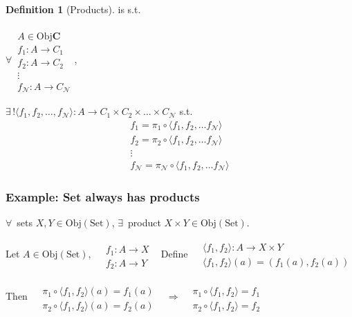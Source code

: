 \documentclass[twoside,landscape,10pt]{amsart}
\theoremstyle{plain}
\theoremstyle{definition}
\newtheorem{definition}{Definition}
\theoremstyle{remark}
\begin{document}
\begin{multicols*}{2}
\begin{definition}[Products]
is s.t. 

$\forall \, \begin{aligned}  \quad \\ 
  A \in \text{Obj}\mathbf{C} \\
  f_1 : A \to C_1 \\
  f_2 : A \to C_2 \\
  \vdots \\
  f_{\mathcal{N}} : A \to C_{\mathcal{N}} \end{aligned}$, 

$\exists \, ! \langle f_1 ,f_2 , \dots , f_{\mathcal{N}} \rangle : A \to C_1 \times C_2 \times \dots \times C_{\mathcal{N}}$ s.t.
\[
\begin{aligned}
  f_1 = \pi_1 \circ \langle f_1 , f_2 , \dots f_{\mathcal{N}} \rangle \\ 
  f_2 = \pi_2 \circ \langle f_1 , f_2 , \dots f_{\mathcal{N}} \rangle \\ 
\vdots  \\ 
  f_{\mathcal{N}} = \pi_{\mathcal{N}} \circ \langle f_1 , f_2 , \dots f_{\mathcal{N}} \rangle 
\end{aligned}
\]

\end{definition}



\subsubsection{Example: Set always has products}

$\forall \, $ sets $X,Y \in \text{Obj}(\text{Set})$, $\exists \, $ product $X\times Y \in \text{Obj}(\text{Set})$.  

Let $A \in \text{Obj}(\text{Set})$, $\begin{aligned} & \quad \\
  & f_1 : A \to X \\
  & f_2 : A \to Y \end{aligned}$ \qquad \, Define $\begin{aligned} & \langle f_1, f_2 \rangle : A \to X \times Y  \\
  & \langle f_1 ,f_2 \rangle (a) = (f_1(a), f_2(a)) \end{aligned}$

Then $\begin{aligned} & \quad \\
  & \pi_1 \circ \langle f_1 , f_2 \rangle (a) = f_1(a) \\
  & \pi_2 \circ \langle f_1, f_2 \rangle (a) = f_2(a) \end{aligned}$ \qquad \, $\Longrightarrow \begin{aligned}  & \quad \\
  & \pi_1 \circ \langle f_1 , f_2 \rangle = f_1 \\
  & \pi_2 \circ \langle f_1,f_2 \rangle = f_2 \end{aligned}$


\end{multicols*}
\end{document}
